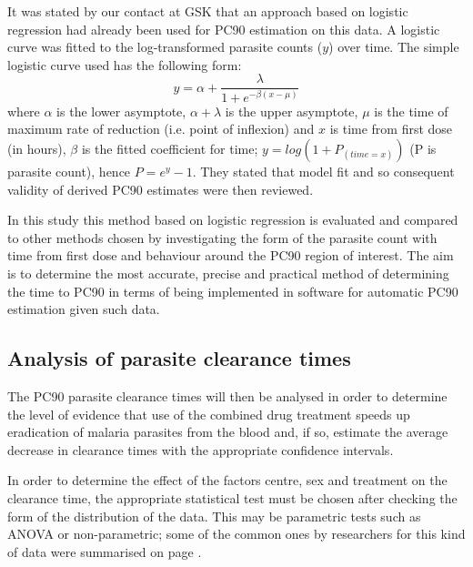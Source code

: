 It was stated by our contact at GSK that an approach based on logistic regression had already been used for PC90 estimation on this data. A logistic curve was fitted to the log-transformed parasite counts ($y$) over time. The simple logistic curve used has the following form: 
$$
y=\alpha+\frac{\lambda}{1+e^{-\beta(x-\mu)}}
$$
where $\alpha$ is the lower asymptote, $\alpha+\lambda$ is the upper asymptote, $\mu$ is the time of maximum rate of reduction (i.e. point of inflexion) and $x$ is time from first dose (in hours), $\beta$ is the fitted coefficient for time; $y = log(1 + P_{(time=x)})$ (P is parasite count), hence $P = e^{y}-1$. They stated that model fit and so consequent validity of derived PC90 estimates were then reviewed.

In this study this method based on logistic regression is evaluated and compared to other methods chosen by investigating the form of the parasite count with time from first dose and behaviour around the PC90 region of interest. The aim is to determine the most accurate, precise and practical method of determining the time to PC90 in terms of being implemented in software for automatic PC90 estimation given such data.

\subsection{Analysis of parasite clearance times}
The PC90 parasite clearance times will then be analysed in order to determine the level of evidence that use of the combined drug treatment speeds up eradication of malaria parasites from the blood and, if so, estimate the average decrease in clearance times with the appropriate confidence intervals.

In order to determine the effect of the factors centre, sex and treatment on the clearance time, the appropriate statistical test must be chosen after checking the form of the distribution of the data. This may be parametric tests such as ANOVA or non-parametric; some of the common ones by researchers for this kind of data were summarised on page \pageref{stat-tests}.

